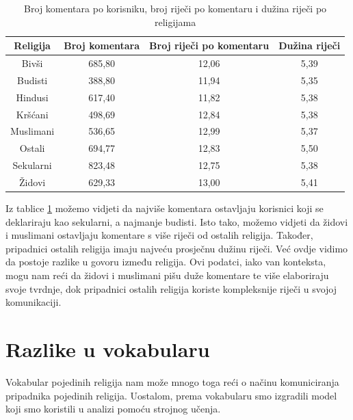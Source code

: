 \documentclass[times,utf8,zavrsni]{fer}
\begin{document}
\begin{table}[h!]
\centering
\caption{Broj komentara po korisniku, broj riječi po komentaru i dužina riječi po religijama}
\label{table:desc}
\begin{tabular}{@{}cccc@{}}
\hline
Religija  & Broj komentara & Broj riječi po komentaru & Dužina riječi \\ 
\hline
\hline
Bivši     &  685,80   & 12,06                              & 5,39                    \\
Budisti   &  388,80    & 11,94                              & 5,35                    \\
Hindusi   &  617,40  & 11,82                              & 5,38                   \\
Kršćani   &  498,69   & 12,84                              & 5,38                    \\
Muslimani &  536,65  & 12,99                              & 5,37                    \\
Ostali    &  694,77    & 12,83                              & 5,50                    \\
Sekularni &  823,48  & 12,75                              & 5,38                    \\
Židovi    &  629,33  & 13,00                              & 5,41                    \\

\hline
\end{tabular}
\end{table}


Iz tablice \ref{table:desc} možemo vidjeti da najviše komentara ostavljaju korisnici koji se deklariraju kao sekularni, a najmanje budisti. Isto tako, možemo vidjeti da židovi i muslimani ostavljaju komentare s više riječi od ostalih religija. Također, pripadnici ostalih religija imaju najveću prosječnu dužinu riječi. Već ovdje vidimo da postoje razlike u govoru između religija. Ovi podatci, iako van konteksta, mogu nam reći da židovi i muslimani pišu duže komentare te više elaboriraju svoje tvrdnje, dok pripadnici ostalih religija koriste kompleksnije riječi u svojoj komunikaciji.



\newpage

\section{Razlike u vokabularu}

Vokabular pojedinih religija nam može mnogo toga reći o načinu komuniciranja pripadnika pojedinih religija. Uostalom, prema vokabularu smo izgradili model koji smo koristili u analizi pomoću strojnog učenja. \\
\end{document}
